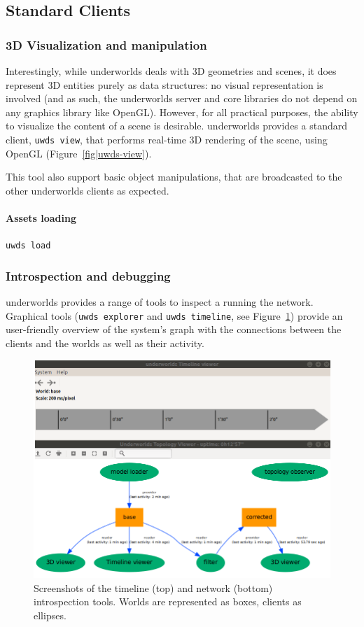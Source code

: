 \documentclass[letterpaper, 10 pt, conference]{ieeeconf}  %
\newcommand{\uwds}{{\sc underworlds}\xspace}
\begin{document}
\subsection{Standard Clients}
\label{std_clients}

\subsubsection{3D Visualization and manipulation}

Interestingly, while \uwds deals with 3D geometries and scenes, it does
represent 3D entities purely as data structures: no visual representation is
involved (and as such, the \uwds server and core libraries do not depend on any
graphics library like OpenGL). However, for all practical purposes, the ability
to visualize the content of a scene is desirable. \uwds provides a standard
client, {\tt uwds view}, that performs real-time 3D rendering of the scene,
using OpenGL (Figure~\ref{fig|uwds-view}).

This tool also support basic object manipulations, that are broadcasted to the
other \uwds clients as expected.

\paragraph{Assets loading}

{\tt uwds load}

\subsubsection{Introspection and debugging}

\uwds provides a range of tools to inspect a running the network. Graphical
tools ({\tt uwds explorer} and {\tt uwds timeline}, see Figure~\ref{fig|explorer})
provide an user-friendly overview of the system's graph with the connections
between the clients and the worlds as well as their activity.

\begin{figure}
    \centering
    \includegraphics[width=\linewidth]{tools}
    \caption{Screenshots of the timeline (top) and network (bottom)
    introspection tools. Worlds are represented as boxes, clients as ellipses.}
    \label{fig|explorer}
\end{figure}
\end{document}
